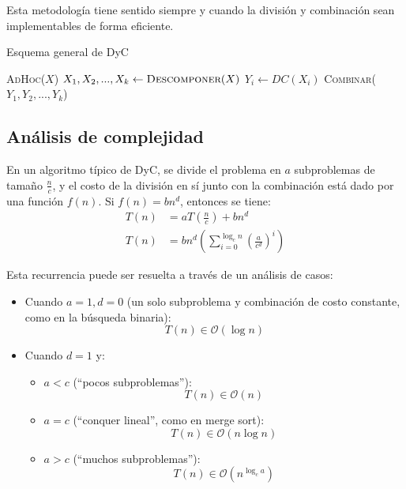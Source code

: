 \documentclass{article}
\newcommand{\BigO}[1]{{\mathcal{O}(#1)}}
\begin{document}
Esta metodología tiene sentido siempre y cuando la división y combinación sean implementables de forma eficiente.
\begin{algorithm}[H]
    \caption*{Esquema general de DyC}
    \begin{algorithmic}
         
        \State \Return \textsc{AdHoc}($X$)
        \Else {}
        \State $X_1, X_2, ..., X_k \gets \textsc{Descomponer}(X)$
        \State $Y_i \gets DC(X_i)$
        \EndFor
        \State \Return \textsc{Combinar}($Y_1, Y_2, ..., Y_k$)
        \EndIf
        \EndFunction
    \end{algorithmic}
\end{algorithm}

\subsection{Análisis de complejidad}

En un algoritmo típico de DyC, se divide el problema en $a$ subproblemas de tamaño $\frac{n}{c}$, y el costo de la división en sí junto con la combinación está dado por una función $f(n)$. Si $f(n) = bn^d$, entonces se tiene:
\begin{align*}
    T(n) & = aT\left(\frac{n}{c}\right) + bn^d                                     \\
    T(n) & = bn^d \left(\sum_{i=0}^{\log_c{n}} \left(\frac{a}{c^d}\right)^i\right)
\end{align*}

Esta recurrencia puede ser resuelta a través de un análisis de casos:
\begin{itemize}
    \item Cuando $a = 1, d = 0$ (un solo subproblema y combinación de costo constante, como en la búsqueda binaria):
          $$T(n) \in \BigO{\log{n}}$$
    \item Cuando $d = 1$ y:
          \begin{itemize}
              \item $a < c$ (``pocos subproblemas''):
                    $$T(n) \in \BigO{n}$$
              \item $a = c$ (``conquer lineal'', como en merge sort):
                    $$T(n) \in \BigO{n\log{n}}$$
              \item $a > c$ (``muchos subproblemas''):
                    $$T(n) \in \BigO{n^{\log_c{a}}}$$
          \end{itemize}
\end{itemize}
\end{document}
